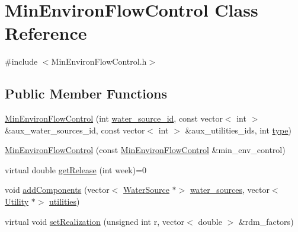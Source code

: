\hypertarget{classMinEnvironFlowControl}{}\section{Min\+Environ\+Flow\+Control Class Reference}
\label{classMinEnvironFlowControl}


{\ttfamily \#include $<$Min\+Environ\+Flow\+Control.\+h$>$}

\subsection*{Public Member Functions}
\begin{DoxyCompactItemize}
\item 
\mbox{\hyperlink{classMinEnvironFlowControl_a5b40c3f8da8c63513edb30804bf2ca01}{Min\+Environ\+Flow\+Control}} (int \mbox{\hyperlink{classMinEnvironFlowControl_a571d4d56086eb752aebb20b2d85fa8e7}{water\+\_\+source\+\_\+id}}, const vector$<$ int $>$ \&aux\+\_\+water\+\_\+sources\+\_\+id, const vector$<$ int $>$ \&aux\+\_\+utilities\+\_\+ids, int \mbox{\hyperlink{classMinEnvironFlowControl_a1a10a6b5720c934eef698cd72c9d883c}{type}})
\item 
\mbox{\hyperlink{classMinEnvironFlowControl_a274fc5217a2a79d9c488d903708f5e68}{Min\+Environ\+Flow\+Control}} (const \mbox{\hyperlink{classMinEnvironFlowControl}{Min\+Environ\+Flow\+Control}} \&min\+\_\+env\+\_\+control)
\item 
virtual double \mbox{\hyperlink{classMinEnvironFlowControl_ac7357455a533f7e6882cdb1ef303359b}{get\+Release}} (int week)=0
\item 
void \mbox{\hyperlink{classMinEnvironFlowControl_a9dd9d33661f121dda9704288658ecf7e}{add\+Components}} (vector$<$ \mbox{\hyperlink{classWaterSource}{Water\+Source}} $\ast$$>$ \mbox{\hyperlink{classMinEnvironFlowControl_ac5be281d802ad1de433bed588bb13cfe}{water\+\_\+sources}}, vector$<$ \mbox{\hyperlink{classUtility}{Utility}} $\ast$$>$ \mbox{\hyperlink{classMinEnvironFlowControl_a6c43408d05901838fa567c8e23a37009}{utilities}})
\item 
virtual void \mbox{\hyperlink{classMinEnvironFlowControl_a99dd7bb49edc3ae8f919e403ccc92bd9}{set\+Realization}} (unsigned int r, vector$<$ double $>$ \&rdm\+\_\+factors)
\end{DoxyCompactItemize}
